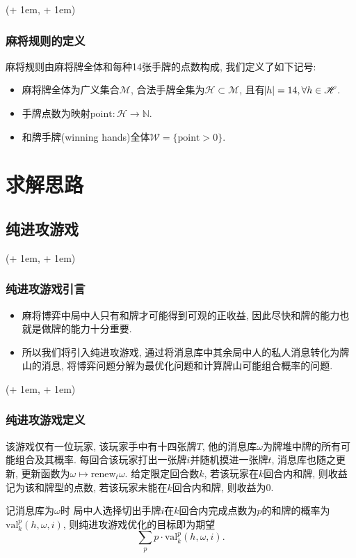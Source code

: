 \documentclass[xcolor=dvipsnames]{ctexbeamer}
\newcommand{\FrameTextCrono}[1]{
    \begin{textblock*}{\paperwidth}(\textwidth + 1em, \textheight + 1em)
        #1
    \end{textblock*}
}
\let\oldframe\frame
\let\oldendframe\endframe
\renewenvironment{frame}
    {\oldframe\FrameTextCrono{\small\color{blue}{\crono}}}
    {\oldendframe}
\newcommand{\mahjong}{\mathscr{M}}
\newcommand{\point}{\mathrm{point}}
\newcommand{\Hand}{\mathscr{H}}
\newcommand{\hand}{h}
\newcommand{\base}{\omega}
\begin{document}
    \begin{frame}
        \frametitle{麻将规则的定义}
        \begin{definition}[麻将规则]
            麻将规则由麻将牌全体和每种14张手牌的点数构成, 我们定义了如下记号:
            \begin{itemize}
                \item 麻将牌全体为广义集合$\mahjong$,
                    合法手牌全集为$\Hand\subset\mahjong$,
                    且有$\abs{\hand}=14, \forall{\hand\in\Hand}$.
                \item 手牌点数为映射$\point: \Hand\rightarrow\mathbb{N}$.
                \item 和牌手牌(winning hands)全体$\mathscr{W}=\{\point>0\}$.
            \end{itemize}
        \end{definition}
    \end{frame}

    \section{求解思路}

    \subsection{纯进攻游戏}

    \begin{frame}
        \frametitle{纯进攻游戏引言}
        \begin{itemize}
            \item 麻将博弈中局中人只有和牌才可能得到可观的正收益,
                因此尽快和牌的能力也就是做牌的能力十分重要.
            \item 所以我们将引入纯进攻游戏,
                通过将消息库中其余局中人的私人消息转化为牌山的消息,
                将博弈问题分解为最优化问题和计算牌山可能组合概率的问题.
        \end{itemize}
    \end{frame}

    \begin{frame}
        \frametitle{纯进攻游戏定义}
        \begin{definition}[纯进攻游戏]
            该游戏仅有一位玩家, 该玩家手中有十四张牌$T$,
            他的消息库$\base$为牌堆中牌的所有可能组合及其概率.
            每回合该玩家打出一张牌$i$并随机摸进一张牌$t$, 消息库也随之更新,
            更新函数为$\base\mapsto\mathrm{renew}_t{\base}$.
            给定限定回合数$k$,
            若该玩家在$k$回合内和牌, 则收益记为该和牌型的点数,
            若该玩家未能在$k$回合内和牌, 则收益为0.
        \end{definition}
        记消息库为$\base$时
        局中人选择切出手牌$i$在$k$回合内完成点数为$p$的和牌的概率为
        $\mathrm{val}_{k}^{p}(\hand, \base, i)$,
        则纯进攻游戏优化的目标即为期望
        \[\sum_{p}{p\cdot\mathrm{val}_{k}^{p}(\hand, \base, i)}.\]
    \end{frame}
\end{document}

